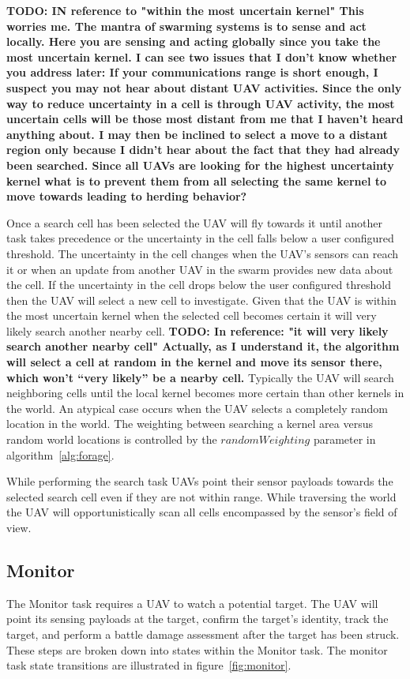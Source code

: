 \textbf{TODO: IN reference to "within the most uncertain kernel"
	This worries me. The mantra of swarming systems is to sense and act locally. Here you are sensing and acting globally since you take the most uncertain kernel. I can see two issues that I don’t know whether you address later:
	If your communications range is short enough, I suspect you may not hear about distant UAV activities. Since the only way to reduce uncertainty in a cell is through UAV activity, the most uncertain cells will be those most distant from me that I haven’t heard anything about. I may then be inclined to select a move to a distant region only because I didn’t hear about the fact that they had already been searched. 
	Since all UAVs are looking for the highest uncertainty kernel what is to prevent them from all selecting the same kernel to move towards leading to herding behavior? } 


Once a search cell has been selected the UAV will fly towards it until another task takes precedence or the uncertainty in the cell falls below a user configured threshold.  The uncertainty in the cell changes when the UAV's sensors can reach it or when an update from another UAV in the swarm provides new data about the cell. If the uncertainty in the cell drops below the user configured threshold then the UAV will select a new cell to investigate.  Given that the UAV is within the most uncertain kernel when the selected cell becomes certain it will very likely search another nearby cell. \textbf{TODO: In reference: "it will very likely search another nearby cell" Actually, as I understand it, the algorithm will select a cell at random in the kernel and move its sensor there, which won’t “very likely” be a nearby cell. }  Typically the UAV will search neighboring cells until the local kernel becomes more certain than other kernels in the world.  An atypical case occurs when the UAV selects a completely random location in the world.  The weighting between searching a kernel area versus random world locations is controlled by the $randomWeighting$ parameter in algorithm~\ref{alg:forage}.

While performing the search task UAVs point their sensor payloads towards the selected search cell even if they are not within range.  While traversing the world the UAV will opportunistically scan all cells encompassed by the sensor's field of view.


\subsection{Monitor}
The Monitor task requires a UAV to watch a potential target.  The UAV will point its sensing payloads at the target, confirm the target's identity, track the target, and perform a battle damage assessment after the target has been struck.  These steps are broken down into states within the Monitor task.  The monitor task state transitions are illustrated in figure~\ref{fig:monitor}.

